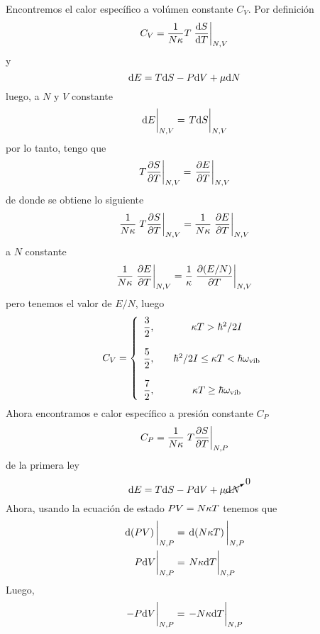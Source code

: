 Encontremos el calor específico a volúmen constante $C_V$. Por definición
\begin{equation}
  C_V=\frac{1}{N\k }T\eval{\dv{S}{T}}_{N,V}
\end{equation}
y
\begin{equation}
  \dd E=T\dd S-P\dd V+\mu\dd N
\end{equation}
luego, a $N$ y $V$ constante
\begin{equation}
  \eval{\dd E}_{N,V}=\eval{T\dd S}_{N,V}
\end{equation}
por lo tanto, tengo que
\begin{equation}
  \eval{T\pdv{S}{T}}_{N,V}=\eval{\pdv{E}{T}}_{N,V}
\end{equation}
de donde se obtiene lo siguiente
\begin{equation}
  \frac{1}{N\k }\eval{T\pdv{S}{T}}_{N,V}=\frac{1}{N\k }\eval{\pdv{E}{T}}_{N,V}
\end{equation}
a $N$ constante
\begin{equation}
  \frac{1}{N\k }\eval{\pdv{E}{T}}_{N,V}=\frac{1}{\k }\eval{\pdv{(E/N)}{T}}_{N,V}
\end{equation}
pero tenemos el valor de $E/N$, luego
\begin{equation}
  C_V=\left\{\begin{array}{ccc}
  	\dfrac{3}{2},&& \kappa T>\hbar^2/2I\\\\
  	\dfrac{5}{2},& &\hbar^2/2I\leq \kappa T<\hbar\omega_{\rm vib}\\\\
  	\dfrac{7}{2},&& \kappa T\geq \hbar\omega_{\rm vib}
  \end{array}\right.
\end{equation}
Ahora encontramos e calor específico a presión constante $C_P$
\begin{equation}
  C_P=\frac{1}{N\k }\eval{T\pdv{S}{T}}_{N,P}
\end{equation}
de la primera ley
\begin{equation}
  \dd E=T\dd S-P\dd V+\mu\cancelto{0}{\dd N}
\end{equation}
Ahora, usando la ecuación de estado $PV=N\kappa T$ tenemos que
\begin{align}
  \eval{\dd (PV)}_{N,P}&=\eval{\dd(N\k T)}_{N,P}\\
  \eval{P\dd V}_{N,P}&=\eval{N\k \dd T}_{N,P}
\end{align}
Luego,
\begin{equation}
  \eval{-P\dd V}_{N,P}=\eval{-N\k \dd T}_{N,P}
\end{equation}
